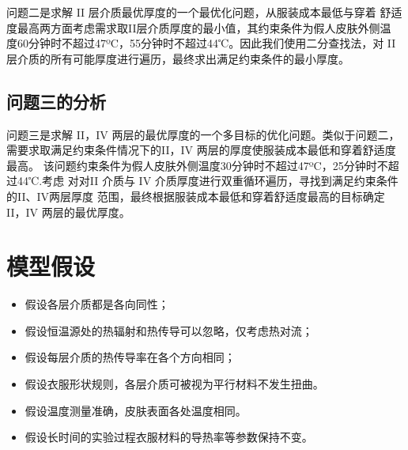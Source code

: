 \documentclass{cumcmthesis}
\begin{document}
    问题二是求解 II 层介质最优厚度的一个最优化问题，从服装成本最低与穿着
    舒适度最高两方面考虑需求取II层介质厚度的最小值，其约束条件为假人皮肤外侧温
    度60分钟时不超过47ºC，55分钟时不超过44℃。因此我们使用二分查找法，对
    II 层介质的所有可能厚度进行遍历，最终求出满足约束条件的最小厚度。


    \subsection{问题三的分析}
    问题三是求解 II，IV 两层的最优厚度的一个多目标的优化问题。类似于问题二，
    需要求取满足约束条件情况下的II，IV 两层的厚度使服装成本最低和穿着舒适度最高。
    该问题约束条件为假人皮肤外侧温度30分钟时不超过47ºC，25分钟时不超过44℃.考虑
    对对II 介质与 IV 介质厚度进行双重循环遍历，寻找到满足约束条件的II、IV两层厚度
    范围，最终根据服装成本最低和穿着舒适度最高的目标确定 II，IV 两层的最优厚度。
\section{模型假设}

\begin{itemize}
\item 假设各层介质都是各向同性；
\item 假设恒温源处的热辐射和热传导可以忽略，仅考虑热对流；
\item 假设每层介质的热传导率在各个方向相同；
\item 假设衣服形状规则，各层介质可被视为平行材料不发生扭曲。
\item 假设温度测量准确，皮肤表面各处温度相同。
\item 假设长时间的实验过程衣服材料的导热率等参数保持不变。
\end{itemize}
\end{document}
